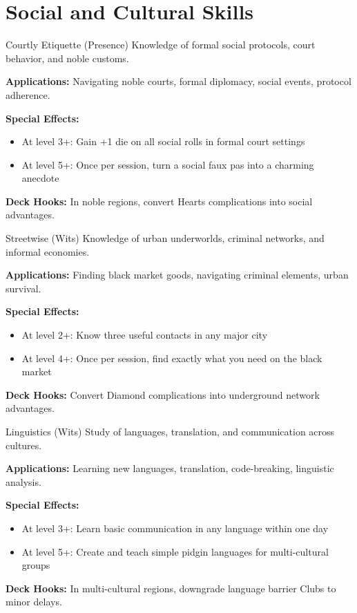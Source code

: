 \section{Social and Cultural Skills}

\begin{skillbox}{Courtly Etiquette (Presence)}
Knowledge of formal social protocols, court behavior, and noble customs.

\textbf{Applications:} Navigating noble courts, formal diplomacy, social events, protocol adherence.

\textbf{Special Effects:}
\begin{itemize}
    \item At level 3+: Gain +1 die on all social rolls in formal court settings
    \item At level 5+: Once per session, turn a social faux pas into a charming anecdote
\end{itemize}

\textbf{Deck Hooks:} In noble regions, convert Hearts complications into social advantages.
\end{skillbox}

\begin{skillbox}{Streetwise (Wits)}
Knowledge of urban underworlds, criminal networks, and informal economies.

\textbf{Applications:} Finding black market goods, navigating criminal elements, urban survival.

\textbf{Special Effects:}
\begin{itemize}
    \item At level 2+: Know three useful contacts in any major city
    \item At level 4+: Once per session, find exactly what you need on the black market
\end{itemize}

\textbf{Deck Hooks:} Convert Diamond complications into underground network advantages.
\end{skillbox}

\begin{skillbox}{Linguistics (Wits)}
Study of languages, translation, and communication across cultures.

\textbf{Applications:} Learning new languages, translation, code-breaking, linguistic analysis.

\textbf{Special Effects:}
\begin{itemize}
    \item At level 3+: Learn basic communication in any language within one day
    \item At level 5+: Create and teach simple pidgin languages for multi-cultural groups
\end{itemize}

\textbf{Deck Hooks:} In multi-cultural regions, downgrade language barrier Clubs to minor delays.
\end{skillbox}

